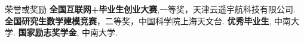 \begin{rubric}{荣誉或奖励}
\entry*[2020] \textbf{全国互联网+毕业生创业大赛},一等奖，天津云遥宇航科技有限公司.
\entry*[2016] \textbf{全国研究生数学建模竞赛}，二等奖，中国科学院上海天文台.
%
\entry*[2014] \textbf{优秀毕业生}, 中南大学.
\entry*[2011] \textbf{国家励志奖学金}, 中南大学.

\end{rubric}